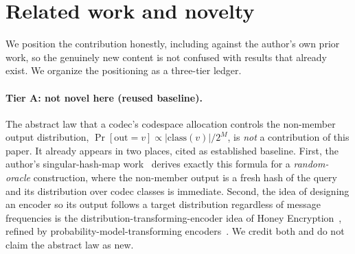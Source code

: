 \documentclass[acmsmall,review]{acmart}
\newcommand{\class}{\mathrm{class}}
\begin{document}
\section{Related work and novelty}
\label{sec:related}

We position the contribution honestly, including against the author's own prior work, so
the genuinely new content is not confused with results that already exist. We organize the
positioning as a three-tier ledger.

\paragraph{Tier A: not novel here (reused baseline).}
The abstract law that a codec's codespace allocation controls the non-member output
distribution, $\Pr[\mathrm{out} = v] \propto |\class(v)|/2^M$, is \emph{not} a contribution
of this paper. It already appears in two places, cited as established baseline. First, the
author's singular-hash-map work~\cite{towell_bernoulli_maps} derives exactly this formula
for a \emph{random-oracle} construction, where the non-member output is a fresh hash of the
query and its distribution over codec classes is immediate. Second, the idea of designing an
encoder so its output follows a target distribution regardless of message frequencies is the
distribution-transforming-encoder idea of Honey Encryption~\cite{juels2014honey}, refined by
probability-model-transforming encoders~\cite{cheng2019pmte}. We credit both and do not claim
the abstract law as new.
\end{document}
